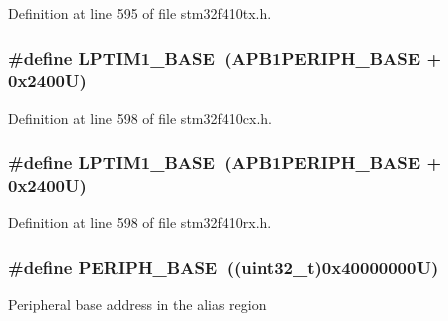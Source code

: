 Definition at line 595 of file stm32f410tx.\+h.

\subsubsection[{\texorpdfstring{L\+P\+T\+I\+M1\+\_\+\+B\+A\+SE}{LPTIM1_BASE}}]{\setlength{\rightskip}{0pt plus 5cm}\#define L\+P\+T\+I\+M1\+\_\+\+B\+A\+SE~({\bf A\+P\+B1\+P\+E\+R\+I\+P\+H\+\_\+\+B\+A\+SE} + 0x2400\+U)}\hypertarget{group___peripheral__registers__structures_ga012ceb003fbb615eedb39a8d7f31c9c6}{}\label{group___peripheral__registers__structures_ga012ceb003fbb615eedb39a8d7f31c9c6}


Definition at line 598 of file stm32f410cx.\+h.

\subsubsection[{\texorpdfstring{L\+P\+T\+I\+M1\+\_\+\+B\+A\+SE}{LPTIM1_BASE}}]{\setlength{\rightskip}{0pt plus 5cm}\#define L\+P\+T\+I\+M1\+\_\+\+B\+A\+SE~({\bf A\+P\+B1\+P\+E\+R\+I\+P\+H\+\_\+\+B\+A\+SE} + 0x2400\+U)}\hypertarget{group___peripheral__registers__structures_ga012ceb003fbb615eedb39a8d7f31c9c6}{}\label{group___peripheral__registers__structures_ga012ceb003fbb615eedb39a8d7f31c9c6}


Definition at line 598 of file stm32f410rx.\+h.

\subsubsection[{\texorpdfstring{P\+E\+R\+I\+P\+H\+\_\+\+B\+A\+SE}{PERIPH_BASE}}]{\setlength{\rightskip}{0pt plus 5cm}\#define P\+E\+R\+I\+P\+H\+\_\+\+B\+A\+SE~((uint32\+\_\+t)0x40000000\+U)}\hypertarget{group___peripheral__registers__structures_ga9171f49478fa86d932f89e78e73b88b0}{}\label{group___peripheral__registers__structures_ga9171f49478fa86d932f89e78e73b88b0}
Peripheral base address in the alias region 

